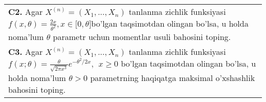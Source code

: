 \documentclass{article}
\begin{document}
\begin{tabular}{m{17cm}}
\\
\textbf{C2.} 
Agar \(X^{(n)} = \left( X_{1},...,X_{n} \right)\) tanlanma zichlik funksiyasi\(f(x,\theta) = \frac{2x}{\theta^{2}},x \in \lbrack 0,\theta\rbrack\)bo'lgan taqsimotdan olingan bo'lsa, u holda noma'lum \(\theta\) parametr uchun momentlar usuli bahosini toping.
\\
\textbf{C3.} 
Agar \(X^{(n)} = \left( X_{1},...,X_{n} \right)\) tanlanma zichlik funksiyasi \(f(x;\theta) = \frac{\theta}{\sqrt{2\pi x^{3}}}e^{- \theta^{2}/2x},\ \ x \geq 0\) bo'lgan taqsimotdan olingan bo'lsa, u holda noma'lum \(\theta > 0\) parametrning haqiqatga maksimal o'xshashlik bahosini toping.
\\

\end{tabular}
\vspace{1cm}
\end{document}
